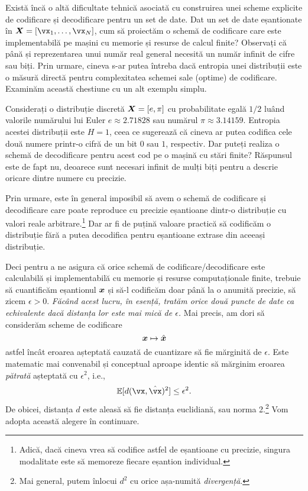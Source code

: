 \documentclass[../../book-main_ro.tex]{subfiles}
\begin{document}
Există încă o altă dificultate tehnică asociată cu construirea unei scheme explicite de codificare și decodificare pentru un set de date. Dat un set de date eșantionate în $\X = [\vx_1, \ldots, \vx_N]$, cum să proiectăm o schemă de codificare care este implementabilă pe mașini cu memorie și resurse de calcul finite? Observați că până și reprezentarea unui număr real general necesită un număr infinit de cifre sau biți. Prin urmare, cineva s-ar putea întreba dacă entropia unei distribuții este o măsură directă pentru complexitatea schemei sale (optime) de codificare. Examinăm această chestiune cu un alt exemplu simplu.

\begin{example}[Precizie] \label{eg:two-inrational}
	Considerați o distribuție discretă $\bm{X} = [e, \pi]$ cu probabilitate egală $1/2$ luând valorile numărului lui Euler $e \approx 2.71828$ sau numărul $\pi \approx 3.14159$. Entropia acestei distribuții este $H =1$, ceea ce sugerează că cineva ar putea codifica cele două numere printr-o cifră de un bit $0$ sau $1$, respectiv. Dar puteți realiza o schemă de decodificare pentru acest cod pe o mașină cu stări finite? Răspunsul este de fapt nu, deoarece sunt necesari infinit de mulți biți pentru a descrie oricare dintre numere cu precizie.
\end{example}

Prin urmare, este în general imposibil să avem o schemă de codificare și decodificare care poate reproduce cu precizie eșantioane dintr-o distribuție cu valori reale arbitrare.\footnote{Adică, dacă cineva vrea să codifice astfel de eșantioane cu precizie, singura modalitate este să memoreze fiecare eșantion individual.} Dar ar fi de puțină valoare practică să codificăm o distribuție fără a putea decodifica pentru eșantioane extrase din aceeași distribuție.

Deci pentru a ne asigura că orice schemă de codificare/decodificare este calculabilă și implementabilă cu memorie și resurse computaționale finite, trebuie să cuantificăm eșantionul $\bm{x}$ și să-l codificăm doar până la o anumită precizie, să zicem $\epsilon > 0$. {\em Făcând acest lucru, în esență, tratăm orice două puncte de date ca echivalente dacă distanța lor este mai mică de $\epsilon$.} Mai precis, am dori să considerăm scheme de codificare
\begin{equation}
	\bm{x} \mapsto \hat {\bm{x}}
\end{equation}
astfel încât eroarea așteptată cauzată de cuantizare să fie mărginită de $\epsilon$. Este matematic mai convenabil și conceptual aproape identic să mărginim eroarea \textit{pătrată} așteptată cu \(\epsilon^{2}\), i.e.,
\begin{equation}
	\Ex[d(\vx, \hat \vx)^{2}] \le \epsilon^{2}.
\end{equation}
De obicei, distanța \(d\) este aleasă să fie distanța euclidiană, sau norma 2.\footnote{Mai general, putem înlocui \(d^{2}\) cu orice așa-numită \textit{divergență}.} Vom adopta această alegere în continuare.
\end{document}
